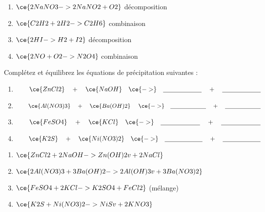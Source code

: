 \documentclass[
  11pt,
  a4paper,
  openany]{book}
\begin{document}
\begin{Answer}

\begin{enumerate}
\def\labelenumi{\arabic{enumi}.}
\item
  \(\ce{2NaNO3 -> 2NaNO2 + O2}\) décomposition
\item
  \(\ce{C2H2 + 2H2 -> C2H6}\) combinaison
\item
  \(\ce{2HI -> H2 + I2}\) décomposition
\item
  \(\ce{2NO + O2 -> N2O4}\) combinaison
\end{enumerate}

\end{Answer}

\begin{Exercise}

Complétez et équilibrez les équations de précipitation suivantes :

\begin{enumerate}
\def\labelenumi{\arabic{enumi}.}
\item
  \(\qquad \ce{ZnCl2} \quad + \quad \ce{NaOH} \quad \ce{->} \quad \underline{\hspace{6em}} \quad + \quad \underline{\hspace{6em}}\)
\item
  \(\qquad \ce{Al(NO3)3} \quad + \quad \ce{Ba(OH)2} \quad \ce{->} \quad \underline{\hspace{6em}} \quad + \quad \underline{\hspace{6em}}\)
\item
  \(\qquad \ce{FeSO4} \quad + \quad \ce{KCl} \quad \ce{->} \quad \underline{\hspace{6em}} \quad + \quad \underline{\hspace{6em}}\)
\item
  \(\qquad \ce{K2S} \quad + \quad \ce{Ni(NO3)2} \quad \ce{->} \quad \underline{\hspace{6em}} \quad + \quad \underline{\hspace{6em}}\)
\end{enumerate}

\end{Exercise}

\begin{Answer}

\begin{enumerate}
\def\labelenumi{\arabic{enumi}.}
\item
  \(\ce{ZnCl2 + 2NaOH -> Zn(OH)2 v + 2NaCl}\)
\item
  \(\ce{ 2Al(NO3)3 + 3Ba(OH)2 -> 2Al(OH)3 v + 3Ba(NO3)2}\)
\item
  \(\ce{FeSO4 + 2KCl -> K2SO4 + FeCl2}\) (mélange)
\item
  \(\ce{K2S + Ni(NO3)2 -> NiS v + 2KNO3}\)
\end{enumerate}

\newpage

\end{Answer}
\end{document}
